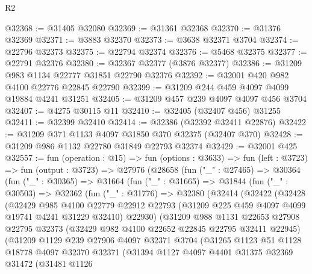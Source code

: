 \begin{lexlean}{R2}
\begin{coremodule}
@32368 := @31405 @32080
@32369 := @31361 @32368
@32370 := @31376 @32369
@32371 := @3883 @32370
@32373 := @3638 @32371 @3704
@32374 := @22796 @32373
@32375 := @22794 @32374
@32376 := @5468 @32375
@32377 := @22791 @32376
@32380 := @32367 @32377 (@3876 @32377)
@32386 := @31209 @983 @1134 @22777 @31851 @22790 @32376
@32392 := @32001 @420 @982 @4100 @22776 @22845 @22790
@32399 := @31209 @244 @459 @4097 @4099 @19884 @4241 @31251
@32405 := @31209 @457 @239 @4097 @4097 @456 @3704
@32407 := @4275 @30115 @11
@32410 := @32405 (@32407 @456) @31255
@32411 := @32399 @32410
@32414 := @32386 (@32392 @32411 @22876)
@32422 := @31209 @371 @1133 @4097 @31850 @370 @32375 (@32407 @370)
@32428 := @31209 @986 @1132 @22780 @31849 @22793 @32374
@32429 := @32001 @425
@32557 := fun (operation : @15) =>
  fun (options : @3633) =>
  fun (left : @3723) =>
  fun (output : @3723) =>
  @27976
    (@28658
      (fun ("_" : @27465) =>
      @30364
        (fun ("_" : @30365) =>
        @31664
          (fun ("_" : @31665) =>
          @31844
            (fun ("_" : @30503) =>
            @32362
              (fun ("_" : @31776) =>
              @32380
                (@32414
                  (@32422
                    (@32428
                      (@32429
                        @985
                        @4100
                        @22779
                        @22912
                        @22793
                        (@31209 @225 @459 @4097 @4099 @19741 @4241 @31229 @32410)
                        @22930)
                      (@31209
                        @988
                        @1131
                        @22653
                        @27908
                        @22795
                        @32373
                        (@32429 @982 @4100 @22652 @22845 @22795 @32411 @22945)
                        (@31209
                          @1129
                          @239
                          @27906
                          @4097
                          @32371
                          @3704
                          (@31265
                            @1123
                            @51
                            @1128
                            @18778
                            @4097
                            @32370
                            @32371
                            (@31394
                              @1127
                              @4097
                              @4401
                              @31375
                              @32369
                              @31472
                              (@31481
                                @1126

\end{coremodule}
\end{lexlean}
